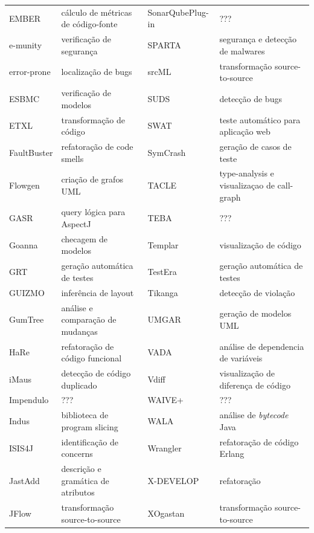 \begin{table}[h]
{\begin{tabular}{| l | l | l | l |}
  EMBER          & cálculo de métricas de código-fonte  & SonarQubePlug-in & ???                                  \\
  e-munity       & verificação de segurança             & SPARTA           & segurança e detecção de malwares     \\
  error-prone    & localização de bugs                  & srcML            & transformação source-to-source       \\
  ESBMC          & verificação de modelos               & SUDS             & detecção de bugs                     \\
  ETXL           & transformação de código              & SWAT             & teste automático para aplicação web  \\
  FaultBuster    & refatoração de code smells           & SymCrash         & geração de casos de teste            \\
  Flowgen        & criação de grafos UML                & TACLE            & type-analysis e visualizaçao de call-graph \\
  GASR           & query lógica para AspectJ            & TEBA             & ???                                  \\
  Goanna         & checagem de modelos                  & Templar          & visualização de código               \\
  GRT            & geração automática de testes         & TestEra          & geração automática de testes         \\
  GUIZMO         & inferência de layout                 & Tikanga          & detecção de violação                 \\
  GumTree        & análise e comparação de mudanças     & UMGAR            & geração de modelos UML               \\
  HaRe           & refatoração de código funcional      & VADA             & análise de dependencia de variáveis  \\
  iMaus          & detecção de código duplicado         & Vdiff            & visualização de diferença de código  \\
  Impendulo      & ???                                  & WAIVE+           & ???                                  \\
  Indus          & biblioteca de program slicing        & WALA             & análise de {\it bytecode} Java       \\
  ISIS4J         & identificação de concerns            & Wrangler         & refatoração de código Erlang         \\
  JastAdd        & descrição e gramática de atributos   & X-DEVELOP        & refatoração                          \\
  JFlow          & transformação source-to-source       & XOgastan         & transformação source-to-source       \\
  \hline
\end{tabular}
\label{resumo-de-ferramentas}
}
\end{table}

